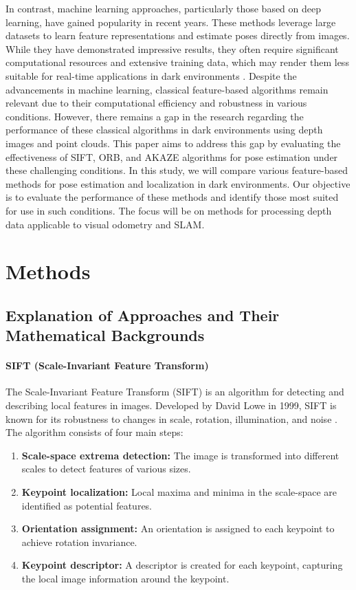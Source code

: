 \documentclass[conference, a4paper]{IEEEtran}
\begin{document}
In contrast, machine learning approaches, particularly those based on deep learning, have gained popularity in recent years. These methods leverage large datasets to learn feature representations and estimate poses directly from images. While they have demonstrated impressive results, they often require significant computational resources and extensive training data, which may render them less suitable for real-time applications in dark environments \cite{arxiv2, arxiv3}.
Despite the advancements in machine learning, classical feature-based algorithms remain relevant due to their computational efficiency and robustness in various conditions. However, there remains a gap in the research regarding the performance of these classical algorithms in dark environments using depth images and point clouds. This paper aims to address this gap by evaluating the effectiveness of SIFT, ORB, and AKAZE algorithms for pose estimation under these challenging conditions.
In this study, we will compare various feature-based methods for pose estimation and localization in dark environments. Our objective is to evaluate the performance of these methods and identify those most suited for use in such conditions. The focus will be on methods for processing depth data applicable to visual odometry and SLAM.


\section{Methods}

\subsection{Explanation of Approaches and Their Mathematical Backgrounds}

\paragraph{SIFT (Scale-Invariant Feature Transform)}
The Scale-Invariant Feature Transform (SIFT) is an algorithm for detecting and describing local features in images. Developed by David Lowe in 1999, SIFT is known for its robustness to changes in scale, rotation, illumination, and noise \cite{sift}. The algorithm consists of four main steps:
\begin{enumerate}
	\item \textbf{Scale-space extrema detection:} The image is transformed into different scales to detect features of various sizes.
	\item \textbf{Keypoint localization:} Local maxima and minima in the scale-space are identified as potential features.
	\item \textbf{Orientation assignment:} An orientation is assigned to each keypoint to achieve rotation invariance.
	\item \textbf{Keypoint descriptor:} A descriptor is created for each keypoint, capturing the local image information around the keypoint.
\end{enumerate}
\end{document}
